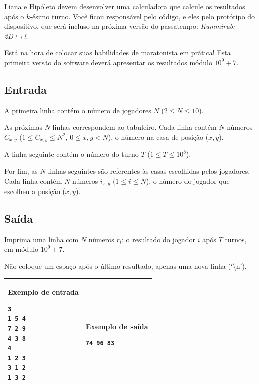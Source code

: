 Liana e Hipóleto devem desenvolver uma calculadora que calcule os resultados após o $k$-ésimo turno. Você ficou responsável pelo código, e eles pelo protótipo do dispositivo, que será incluso na próxima versão do passatempo: \textit{Kummirub: 2D++!}. 

Está na hora de colocar suas habilidades de maratonista em prática! Esta primeira versão do software deverá apresentar os resultados módulo $10^9 + 7$.


\subsection*{Entrada}
A primeira linha contém o número de jogadores $N$ ($2 \leq N \leq 10$).

As próximas $N$ linhas correspondem ao tabuleiro. Cada linha contém $N$ números $C_{x, y}$ ($1 \leq C_{x, y} \leq N^2$, $0 \leq x, y < N$), o número na casa de posição ($x, y$).

A linha seguinte contém o número do turno $T$ ($1 \leq T \leq 10^8$).

Por fim, as $N$ linhas seguintes são referentes às casas escolhidas pelos jogadores. Cada linha contém $N$ números $i_{x, y}$ ($1 \leq i \leq N$), o número do jogador que escolheu a posição ($x, y$).


\subsection*{Saída}
Imprima uma linha com $N$ números $r_i$: o resultado do jogador $i$ após $T$ turnos, em módulo $10^9 + 7$.

Não coloque um espaço após o último resultado, apenas uma nova linha (`\textbackslash n').


\begin{table}[!h]
\centering
\begin{tabular}{|l|l|}
\hline
\begin{minipage}[t]{3in}
\textbf{Exemplo de entrada}
\begin{verbatim}
3
1 5 4
7 2 9
4 3 8
4
1 2 3
3 1 2
1 3 2
\end{verbatim}
\vspace{1mm}
\end{minipage}
&
\begin{minipage}[t]{3in}
\textbf{Exemplo de saída}
\begin{verbatim}
74 96 83
\end{verbatim}
\vspace{1mm}
\end{minipage} \\
\hline
\end{tabular}
\end{table}

